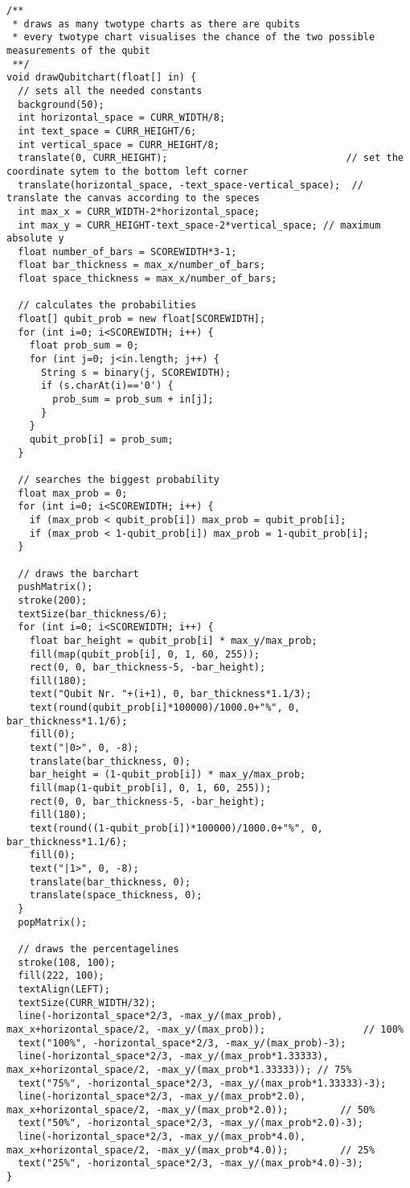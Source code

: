 \documentclass[12pt]{report}
\begin{document}
\begin{lstlisting}
/**
 * draws as many twotype charts as there are qubits
 * every twotype chart visualises the chance of the two possible measurements of the qubit
 **/
void drawQubitchart(float[] in) {
  // sets all the needed constants
  background(50);
  int horizontal_space = CURR_WIDTH/8;
  int text_space = CURR_HEIGHT/6;
  int vertical_space = CURR_HEIGHT/8;
  translate(0, CURR_HEIGHT);                               // set the coordinate sytem to the bottom left corner
  translate(horizontal_space, -text_space-vertical_space);  // translate the canvas according to the speces
  int max_x = CURR_WIDTH-2*horizontal_space;
  int max_y = CURR_HEIGHT-text_space-2*vertical_space; // maximum absolute y
  float number_of_bars = SCOREWIDTH*3-1;
  float bar_thickness = max_x/number_of_bars;
  float space_thickness = max_x/number_of_bars;

  // calculates the probabilities
  float[] qubit_prob = new float[SCOREWIDTH];
  for (int i=0; i<SCOREWIDTH; i++) {
    float prob_sum = 0;
    for (int j=0; j<in.length; j++) {
      String s = binary(j, SCOREWIDTH);
      if (s.charAt(i)=='0') {
        prob_sum = prob_sum + in[j];
      }
    }
    qubit_prob[i] = prob_sum;
  }
  
  // searches the biggest probability
  float max_prob = 0;
  for (int i=0; i<SCOREWIDTH; i++) {
    if (max_prob < qubit_prob[i]) max_prob = qubit_prob[i];
    if (max_prob < 1-qubit_prob[i]) max_prob = 1-qubit_prob[i];
  }

  // draws the barchart
  pushMatrix();
  stroke(200);
  textSize(bar_thickness/6);
  for (int i=0; i<SCOREWIDTH; i++) {
    float bar_height = qubit_prob[i] * max_y/max_prob;
    fill(map(qubit_prob[i], 0, 1, 60, 255));
    rect(0, 0, bar_thickness-5, -bar_height);
    fill(180);
    text("Qubit Nr. "+(i+1), 0, bar_thickness*1.1/3);
    text(round(qubit_prob[i]*100000)/1000.0+"%", 0, bar_thickness*1.1/6);
    fill(0);
    text("|0>", 0, -8);
    translate(bar_thickness, 0);
    bar_height = (1-qubit_prob[i]) * max_y/max_prob;
    fill(map(1-qubit_prob[i], 0, 1, 60, 255));
    rect(0, 0, bar_thickness-5, -bar_height);
    fill(180);
    text(round((1-qubit_prob[i])*100000)/1000.0+"%", 0, bar_thickness*1.1/6);
    fill(0);
    text("|1>", 0, -8);
    translate(bar_thickness, 0);
    translate(space_thickness, 0);
  }
  popMatrix();

  // draws the percentagelines
  stroke(108, 100);
  fill(222, 100);
  textAlign(LEFT);
  textSize(CURR_WIDTH/32);
  line(-horizontal_space*2/3, -max_y/(max_prob), max_x+horizontal_space/2, -max_y/(max_prob));                 // 100%
  text("100%", -horizontal_space*2/3, -max_y/(max_prob)-3);
  line(-horizontal_space*2/3, -max_y/(max_prob*1.33333), max_x+horizontal_space/2, -max_y/(max_prob*1.33333)); // 75%
  text("75%", -horizontal_space*2/3, -max_y/(max_prob*1.33333)-3);
  line(-horizontal_space*2/3, -max_y/(max_prob*2.0), max_x+horizontal_space/2, -max_y/(max_prob*2.0));         // 50%
  text("50%", -horizontal_space*2/3, -max_y/(max_prob*2.0)-3);
  line(-horizontal_space*2/3, -max_y/(max_prob*4.0), max_x+horizontal_space/2, -max_y/(max_prob*4.0));         // 25%
  text("25%", -horizontal_space*2/3, -max_y/(max_prob*4.0)-3);
}


\end{lstlisting}
\end{document}
